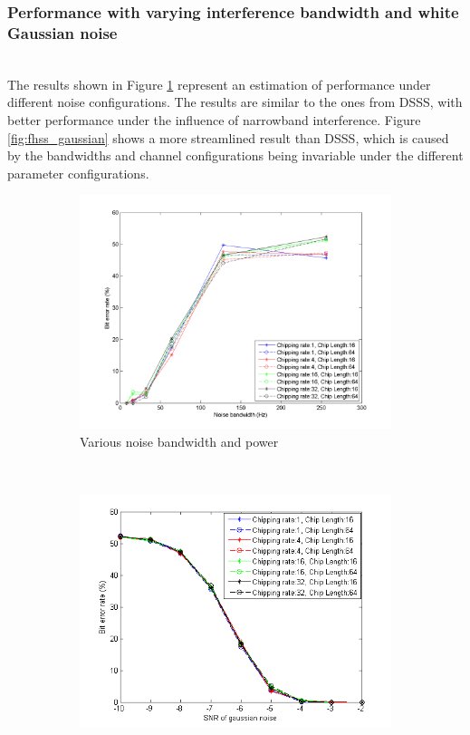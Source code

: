 			
		\subsubsection{Performance with varying interference bandwidth and white Gaussian noise}~\\
			The results shown in Figure \ref{fig:fhss_bandwidth} represent an estimation of performance under different noise configurations.
			The results are similar to the ones from DSSS, with better performance under the influence of narrowband interference.
			Figure \ref{fig:fhss_gaussian} shows a more streamlined result than DSSS, which is caused by the bandwidths and channel configurations being invariable under the different parameter configurations.
	
			\begin{figure}[H]
				\centering
				\begin{subfigure}[b]{0.5\textwidth}
					\includegraphics[width=\textwidth]{imgs/results/plot_mode_fhss-test_bandwidthAndPower-rep_20-dataRate_8-dataLength_128.png}
					\caption{Various noise bandwidth and power}
					\label{fig:fhss_bandwidth}
				\end{subfigure}%
				~
				\begin{subfigure}[b]{0.5\textwidth}
					\includegraphics[width=\textwidth]{imgs/results/plot_mode_fhss-test_gaussianSNR-rep_20-dataRate_8-dataLength_128_fixedlegend.png}

\end{subfigure}
\end{figure}
